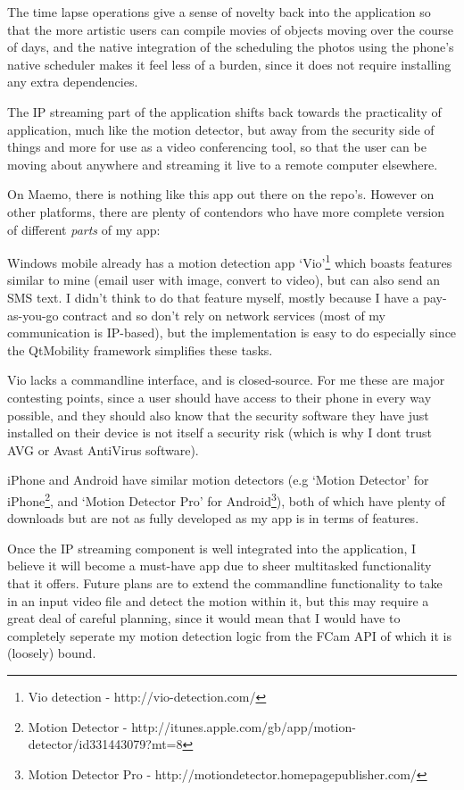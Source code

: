 \documentclass[11pt]{article} %
\begin{document}
The time lapse operations give a sense of novelty back into the application so that the more artistic users can compile movies of objects moving over the course of days, and the native integration of the scheduling the photos using the phone’s native scheduler makes it feel less of a burden, since it does not require installing any extra dependencies.

The IP streaming part of the application shifts back towards the practicality of application, much like the motion detector, but away from the security side of things and more for use as a video conferencing tool, so that the user can be moving about anywhere and streaming it live to a remote computer elsewhere.

On Maemo, there is nothing like this app out there on the repo’s. However on other platforms, there are plenty of contendors who have more complete version of different {\it parts} of my app:

Windows mobile already has a motion detection app ‘Vio’\footnote{Vio detection - http://vio-detection.com/}\label{ref:vio} which boasts features similar to mine (email user with image, convert to video), but can also send an SMS text.  I didn’t think to do that feature myself, mostly because  I have a pay-as-you-go contract and so don’t rely on network services (most of my communication is IP-based), but the implementation is easy to do especially since the QtMobility framework simplifies these tasks. 

Vio lacks a commandline interface, and is closed-source. For me these are major contesting points, since a user should have access to their phone in every way possible, and they should also know that the security software they have just installed on their device is not itself a security risk (which is why I dont trust AVG or Avast AntiVirus software).

iPhone and Android have similar motion detectors (e.g ‘Motion Detector’ for iPhone\footnote{Motion Detector - http://itunes.apple.com/gb/app/motion-detector/id331443079?mt=8}\label{ref:moip}, and ‘Motion Detector Pro’ for Android\footnote{Motion Detector Pro - http://motiondetector.homepagepublisher.com/}\label{ref:moan}), both of which have plenty of downloads but are not as fully developed as my app is in terms of features.

Once the IP streaming component is well integrated into the application, I believe it will become a must-have app due to sheer multitasked functionality that it offers. Future plans are to extend the commandline functionality to take in an input video file and detect the motion within it, but this may require a great deal of careful planning, since it would mean that I would have to completely seperate my motion detection logic from the FCam API of which it is (loosely) bound.
\end{document}
